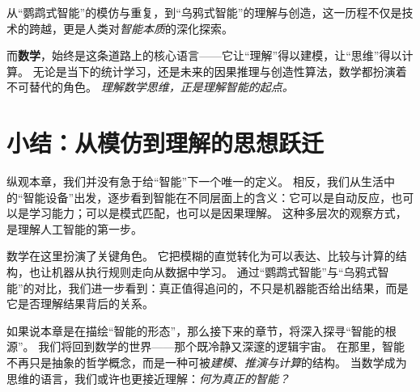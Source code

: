 从“鹦鹉式智能”的模仿与重复，到“乌鸦式智能”的理解与创造，这一历程不仅是技术的跨越，更是人类对\emph{智能本质}的深化探索。  

而\textbf{数学}，始终是这条道路上的核心语言——它让“理解”得以建模，让“思维”得以计算。  
无论是当下的统计学习，还是未来的因果推理与创造性算法，数学都扮演着不可替代的角色。  
\emph{理解数学思维，正是理解智能的起点。}  

\section{小结：从模仿到理解的思想跃迁}

纵观本章，我们并没有急于给“智能”下一个唯一的定义。  
相反，我们从生活中的“智能设备”出发，逐步看到智能在不同层面上的含义：它可以是自动反应，也可以是学习能力；可以是模式匹配，也可以是因果理解。  
这种多层次的观察方式，是理解人工智能的第一步。

数学在这里扮演了关键角色。  
它把模糊的直觉转化为可以表达、比较与计算的结构，也让机器从执行规则走向从数据中学习。  
通过“鹦鹉式智能”与“乌鸦式智能”的对比，我们进一步看到：真正值得追问的，不只是机器能否给出结果，而是它是否理解结果背后的关系。  

如果说本章是在描绘“智能的形态”，那么接下来的章节，将深入探寻“智能的根源”。  
我们将回到数学的世界——那个既冷静又深邃的逻辑宇宙。  
在那里，智能不再只是抽象的哲学概念，而是一种可被\emph{建模、推演与计算}的结构。  
当数学成为思维的语言，我们或许也更接近理解：\emph{何为真正的智能？}  

\nocite{*}

